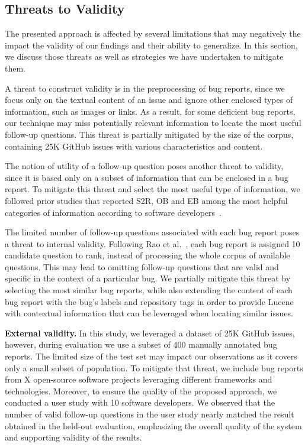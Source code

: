 \subsection{Threats to Validity}
The presented approach is affected by several limitations that may negatively the impact the validity of our findings and their ability to generalize. In this section, we discuss those threats as well as strategies we have undertaken to mitigate them.

A threat to construct validity is in the preprocessing of bug reports, since we focus only on the textual content of an issue and ignore other enclosed types of information, such as images or links. As a result, for some deficient bug reports, our technique may miss potentially relevant information to locate the most useful follow-up questions. This threat is partially mitigated by the size of the corpus, containing 25K GitHub issues with various characteristics and content.

The notion of utility of a follow-up question poses another threat to validity, since it is based only on a subset of information that can be enclosed in a bug report. To mitigate this threat and select the most useful type of information, we followed prior studies that reported S2R, OB and EB among the most helpful categories of information according to software developers~\cite{Zimmermann2010}.



The limited number of follow-up questions associated with each bug report poses a threat to internal validity. Following Rao et al.~\cite{rao-daume-iii-2018-learning}, each bug report is assigned 10 candidate question to rank, instead of processing the whole corpus of available questions. This  may lead to omitting follow-up questions that are valid and specific in the context of a particular bug. We partially mitigate this threat by selecting the most similar bug reports, while also extending the content of each bug report with the bug's labels and repository tags in order to provide Lucene with contextual information that can be leveraged when locating similar issues.


\noindent\textbf{External validity.}
In this study, we leveraged a dataset of 25K GitHub issues, however, during evaluation we use a subset of 400 manually annotated bug reports. The limited size of the test set may impact our observations as it covers only a small subset of population. To mitigate that threat, we include bug reports from X open-source software projects leveraging different frameworks and technologies. Moreover, to ensure the quality of the proposed approach, we conducted a user study with 10 software developers. We observed that the number of valid follow-up questions in the user study nearly matched the result obtained in the held-out evaluation, emphasizing the overall quality of the system and supporting validity of the results.

